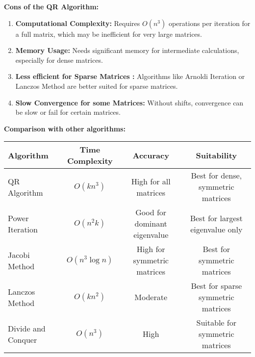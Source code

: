 \documentclass[journal,12pt,onecolumn]{IEEEtran}
\theoremstyle{remark}
\begin{document}
\textbf{Cons of the QR Algorithm:}
\begin{enumerate}
    \item \textbf{Computational Complexity:} Requires $O(n^3)$ operations per iteration for a full matrix, which may be inefficient for very large matrices.\\

    \item \textbf{Memory Usage:} Needs significant memory for intermediate calculations, especially for dense matrices.\\

    \item \textbf{Less efficient for Sparse Matrices :} Algorithms like Arnoldi Iteration or Lanczos Method are better suited for sparse matrices.\\

    \item  \textbf{Slow Convergence for some Matrices:} Without shifts, convergence can be slow or fail for certain matrices.\\
    
\end{enumerate}
\textbf{Comparison with other algorithms:}
 \begin{table}[ht]
\centering
\begin{tabular}{|l|c|c|c|}
\hline
\textbf{Algorithm} & \textbf{Time Complexity} & \textbf{Accuracy} & \textbf{Suitability} \\ 
\hline
QR Algorithm & $O(kn^3)$ & High for all matrices & Best for dense, symmetric matrices \\ 
Power Iteration & $O(n^2k)$ & Good for dominant eigenvalue & Best for largest eigenvalue only \\ 
Jacobi Method & $O(n^3 \log n)$ & High for symmetric matrices & Best for symmetric matrices \\ 
Lanczos Method & $O(kn^2)$ & Moderate & Best for sparse symmetric matrices \\ 
Divide and Conquer & $O(n^3)$ & High & Suitable for symmetric matrices \\ 
\hline 
\end{tabular}
\end{table} \\
\end{document}
